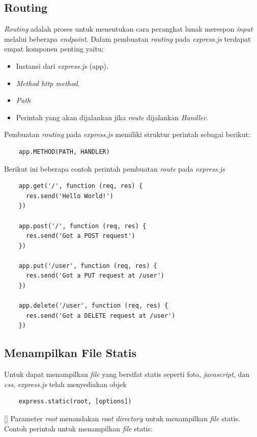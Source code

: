 \subsection{Routing}
\textit{Routing} adalah proses untuk menentukan cara perangkat lunak merespon \textit{input} melalui beberapa \textit{endpoint}. Dalam pembuatan \textit{routing} pada \textit{express.js} terdapat empat komponen penting yaitu:
\begin{itemize}
    \item Instansi dari \textit{express.js} (app).
    \item \textit{Method} \textit{http method}.
    \item \textit{Path}
    \item Perintah yang akan dijalankan jika \textit{route} dijalankan \textit{Handler}.
\end{itemize}
Pembuatan \textit{routing} pada \textit{express.js} memiliki struktur perintah sebagai berikut:
\begin{verbatim}
    app.METHOD(PATH, HANDLER)
\end{verbatim}
Berikut ini beberapa contoh perintah pembuatan \textit{route} pada \textit{express.js}
\begin{lstlisting}
    app.get('/', function (req, res) {
      res.send('Hello World!')
    })
    
    app.post('/', function (req, res) {
      res.send('Got a POST request')
    })
    
    app.put('/user', function (req, res) {
      res.send('Got a PUT request at /user')
    })
    
    app.delete('/user', function (req, res) {
      res.send('Got a DELETE request at /user')
    })
\end{lstlisting}

\subsection{Menampilkan File Statis}
Untuk dapat menampilkan \textit{file} yang bersifat statis seperti foto, \textit{javascript}, dan \textit{css}, \textit{express.js} telah menyediakan objek \begin{verbatim}
    express.static(root, [options])
\end{verbatim}[] 
Parameter \textit{root} menandakan \textit{root directory} untuk menampilkan \textit{file} statis. Contoh perintah untuk menampilkan \textit{file} statis:

